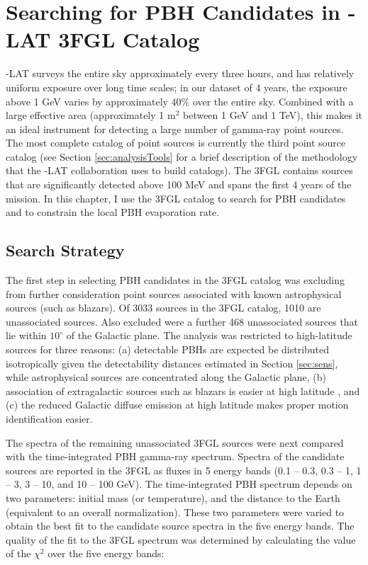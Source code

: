 \chapter{Searching for PBH Candidates in \Fermi-LAT 3FGL Catalog}\label{chapter:pbh_analysis}


\Fermi-LAT surveys the entire sky approximately every three hours, and has relatively uniform exposure over long time scales; in our dataset of 4 years, the exposure above 1 GeV varies by approximately 40\% over the entire sky. Combined with a large effective area (approximately 1 m$^2$ between 1 GeV and 1 TeV), this makes it an ideal instrument for detecting a large number of gamma-ray point sources. 
The most complete catalog of point sources is currently the third \Fermi point source catalog \citep[3FGL, ][]{2015ApJS..218...23A} (see Section \ref{sec:analysisTools} for a brief description of the methodology that the \Fermi-LAT collaboration uses to build catalogs). 
The 3FGL contains sources that are significantly detected above 100 MeV and spans the first 4 years of the \Fermi mission. 
In this chapter, I use the 3FGL catalog to search for PBH candidates and to constrain the local PBH evaporation rate.

\section{Search Strategy}
\label{sec:search}
The first step in selecting PBH candidates in the 3FGL catalog was excluding from further consideration point sources associated with known astrophysical sources (such as blazars). Of 3033 sources in the 3FGL catalog, 1010 are unassociated sources. Also excluded were a further 468 unassociated sources that lie within $10^\circ$ of the Galactic plane. The analysis was restricted to high-latitude sources for three reasons: (a) detectable PBHs are expected be distributed isotropically given the detectability distances estimated in Section \ref{sec:sens}, while astrophysical sources are concentrated along the Galactic plane, (b) association of extragalactic sources such as blazars is easier at high latitude 
\citep[see, e.g.][]{2015ApJ...810...14A}, and (c) the reduced Galactic diffuse emission at high latitude makes proper motion identification easier.

The spectra of the remaining unassociated 3FGL sources were next compared with the time-integrated PBH gamma-ray spectrum.
Spectra of the candidate sources are reported in the 3FGL as fluxes in 5 energy bands (0.1 -- 0.3, 0.3 -- 1, 1 -- 3, 3 -- 10, and 10 -- 100 GeV).
The time-integrated PBH spectrum depends on two parameters: initial mass (or temperature), and the distance to the Earth (equivalent to an overall normalization).
These two parameters were varied to obtain the best fit to the candidate source spectra in the five energy bands.
The quality of the fit to the 3FGL spectrum was determined by calculating the value of the $\chi ^2$ over the five energy bands:

